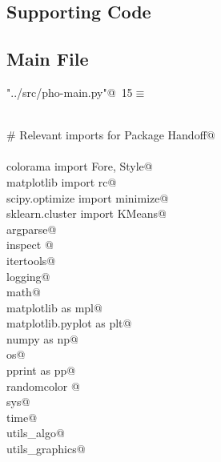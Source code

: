 \documentclass[12.0pt]{report}
\begin{document}
\begin{appendices}
\chapter{Supporting Code}

\section{Main File}



\begin{flushleft} \small\label{scrap7}\raggedright\small
{} \verb@"../src/pho-main.py"@\nobreak\ {\footnotesize {15}}$\equiv$
\vspace{-1ex}
\begin{list}{}{} \item
\mbox{}\verb@@\\
\mbox{}\verb@# Relevant imports for Package Handoff@\\
\mbox{}\verb@@\\
\mbox{}\verb@from colorama import Fore, Style@\\
\mbox{}\verb@from matplotlib import rc@\\
\mbox{}\verb@from scipy.optimize import minimize@\\
\mbox{}\verb@from sklearn.cluster import KMeans@\\
\mbox{}\verb@import argparse@\\
\mbox{}\verb@import inspect @\\
\mbox{}\verb@import itertools@\\
\mbox{}\verb@import logging@\\
\mbox{}\verb@import math@\\
\mbox{}\verb@import matplotlib as mpl@\\
\mbox{}\verb@import matplotlib.pyplot as plt@\\
\mbox{}\verb@import numpy as np@\\
\mbox{}\verb@import os@\\
\mbox{}\verb@import pprint as pp@\\
\mbox{}\verb@import randomcolor @\\
\mbox{}\verb@import sys@\\
\mbox{}\verb@import time@\\
\mbox{}\verb@import utils_algo@\\
\mbox{}\verb@import utils_graphics@\\
\mbox{}\verb@@\\

\end{list}
\end{flushleft}
\end{appendices}
\end{document}

